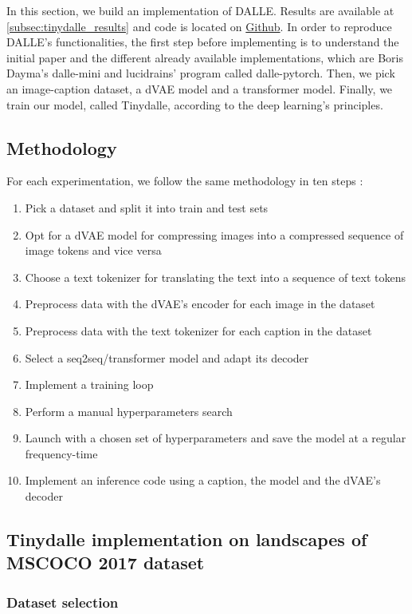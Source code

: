\documentclass{article}
\begin{document}
In this section, we build an implementation of DALLE. Results are available at \ref{subsec:tinydalle_results} and code is located on \href{https://github.com/cthiounn/dalle-tiny}{Github}. In order to reproduce DALLE's functionalities, the first step before implementing is to understand the initial paper and the different already available implementations, which are Boris Dayma's dalle-mini and lucidrains' program called dalle-pytorch. Then, we pick an image-caption dataset, a dVAE model and a transformer model. Finally, we train our model, called Tinydalle, according to the deep learning's principles.

\subsection{Methodology}

For each experimentation, we follow the same methodology in ten steps :

\begin{enumerate}
\item Pick a dataset and split it into train and test sets
    \item Opt for a dVAE model for compressing images into a compressed sequence of image tokens and vice versa
    \item Choose a text tokenizer for translating the text into a sequence of text tokens
    \item Preprocess data with the dVAE's encoder for each image in the dataset
    \item Preprocess data with the text tokenizer for each caption in the dataset
    \item Select a seq2seq/transformer model and adapt its decoder
    \item Implement a training loop
    \item Perform a manual hyperparameters search
    \item Launch with a chosen set of hyperparameters and save the model at a regular frequency-time
    \item Implement an inference code using a caption, the model and the dVAE's decoder
\end{enumerate}

\subsection{Tinydalle implementation on landscapes of MSCOCO 2017 dataset}

\subsubsection{Dataset selection}
\end{document}
